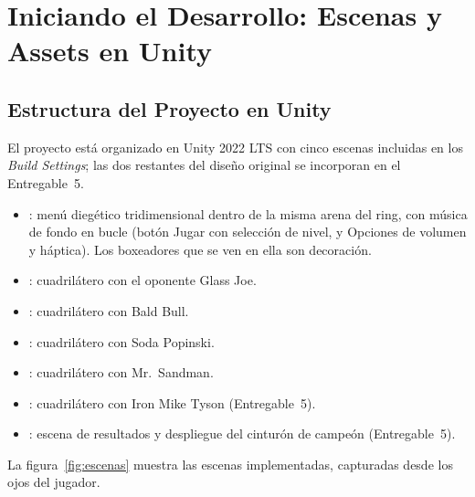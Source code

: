 \section{Iniciando el Desarrollo: Escenas y Assets en Unity}
\subsection{Estructura del Proyecto en Unity}
\label{sec:estructura}
El proyecto está organizado en Unity 2022 LTS con cinco escenas incluidas en los \emph{Build Settings}; las dos restantes del diseño original se incorporan en el Entregable~5.

\begin{itemize}
  \item {}: menú diegético tridimensional dentro de la misma arena del ring, con música de fondo en bucle (botón Jugar con selección de nivel, y Opciones de volumen y háptica). Los boxeadores que se ven en ella son decoración.
  \item {}: cuadrilátero con el oponente Glass Joe.
  \item {}: cuadrilátero con Bald Bull.
  \item {}: cuadrilátero con Soda Popinski.
  \item {}: cuadrilátero con Mr.\ Sandman.
  \item {}: cuadrilátero con Iron Mike Tyson (Entregable~5).
  \item {}: escena de resultados y despliegue del cinturón de campeón (Entregable~5).
\end{itemize}

La figura~\ref{fig:escenas} muestra las escenas implementadas, capturadas desde los ojos del jugador.


